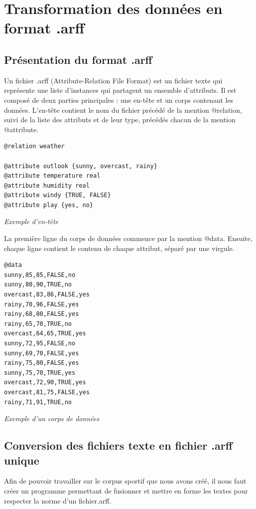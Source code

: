 \documentclass[a4paper,11pt]{article}
\begin{document}
\section{Transformation des données en format .arff}
\subsection{Présentation du format .arff}
Un fichier .arff (Attribute-Relation File Format) est un fichier texte qui représente une liste d’instances qui partagent un ensemble d’attributs. Il est composé de deux parties principales : une en-tête et un corps contenant les données.
L’en-tête contient le nom du fichier précédé de la mention @relation, suivi de la liste des attributs et de leur type, précédés chacun de la mention @attribute.\\

\begin{lstlisting}
@relation weather

@attribute outlook {sunny, overcast, rainy}
@attribute temperature real
@attribute humidity real
@attribute windy {TRUE, FALSE}
@attribute play {yes, no}
\end{lstlisting}
\begin{center}
\textit{Exemple d'en-tête}
\end{center}

La première ligne du corps de données commence par la mention @data. Ensuite, chaque ligne contient le contenu de chaque attribut, séparé par une virgule.\\

\begin{lstlisting}
@data
sunny,85,85,FALSE,no
sunny,80,90,TRUE,no
overcast,83,86,FALSE,yes
rainy,70,96,FALSE,yes
rainy,68,80,FALSE,yes
rainy,65,70,TRUE,no
overcast,64,65,TRUE,yes
sunny,72,95,FALSE,no
sunny,69,70,FALSE,yes
rainy,75,80,FALSE,yes
sunny,75,70,TRUE,yes
overcast,72,90,TRUE,yes
overcast,81,75,FALSE,yes
rainy,71,91,TRUE,no
\end{lstlisting}
\begin{center}
\textit{Exemple d’un corps de données}
\end{center}

\subsection{Conversion des fichiers texte en fichier .arff unique}
Afin de pouvoir travailler sur le corpus sportif que nous avons créé, il nous faut créer un programme permettant de fusionner et mettre en forme les textes pour respecter la norme d’un fichier.arff.
\end{document}
